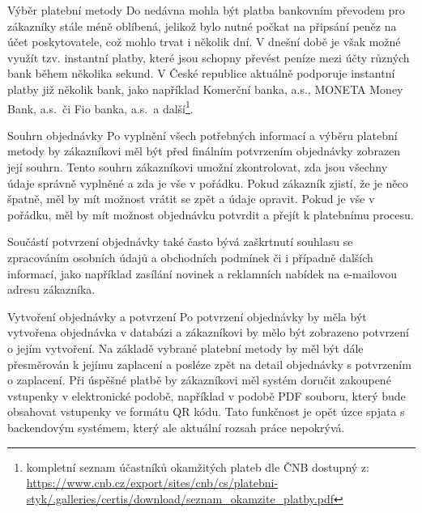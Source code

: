 \begin{subsection}{Výběr platební metody}
    Do nedávna mohla být platba bankovním převodem pro zákazníky stále méně oblíbená, jelikož bylo nutné počkat na připsání peněz na účet poskytovatele, což mohlo trvat i několik dní.
    V dnešní době je však možné využít tzv.
    instantní platby, které jsou schopny převést peníze mezi účty různých bank během několika sekund.
    V České republice aktuálně podporuje instantní platby již několik bank, jako například Komerční banka, a.s., MONETA Money Bank, a.s.\ či Fio banka, a.s.\ a další\footnote{kompletní seznam účastníků okamžitých plateb dle ČNB dostupný z: \url{https://www.cnb.cz/export/sites/cnb/cs/platebni-styk/.galleries/certis/download/seznam_okamzite_platby.pdf}}.
\end{subsection}

\begin{subsection}{Souhrn objednávky}
    \label{subsec:identifikace-dokonceni-objednavky-souhrn-objednavky}
    Po vyplnění všech potřebných informací a výběru platební metody by zákazníkovi měl být před finálním potvrzením objednávky zobrazen její souhrn.
    Tento souhrn zákazníkovi umožní zkontrolovat, zda jsou všechny údaje správně vyplněné a zda je vše v pořádku.
    Pokud zákazník zjistí, že je něco špatně, měl by mít možnost vrátit se zpět a údaje opravit.
    Pokud je vše v pořádku, měl by mít možnost objednávku potvrdit a přejít k platebnímu procesu.

    Součástí potvrzení objednávky také často bývá zaškrtnutí souhlasu se zpracováním osobních údajů a obchodních podmínek či i případně dalších informací, jako například zasílání novinek a reklamních nabídek na e-mailovou adresu zákazníka.
\end{subsection}

\begin{subsection}{Vytvoření objednávky a potvrzení}
    \label{subsec:identifikace-dokonceni-objednavky-vytvoreni-objednavky-a-potvrzeni}
    Po potvrzení objednávky by měla být vytvořena objednávka v databázi a zákazníkovi by mělo být zobrazeno potvrzení o jejím vytvoření.
    Na základě vybrané platební metody by měl být dále přesměrován k jejímu zaplacení a posléze zpět na detail objednávky s potvrzením o zaplacení.
    Při úspěšné platbě by zákazníkovi měl systém doručit zakoupené vstupenky v elektronické podobě, například v podobě PDF souboru, který bude obsahovat vstupenky ve formátu QR kódu.
    Tato funkčnost je opět úzce spjata s backendovým systémem, který ale aktuální rozsah práce nepokrývá.
\end{subsection}
